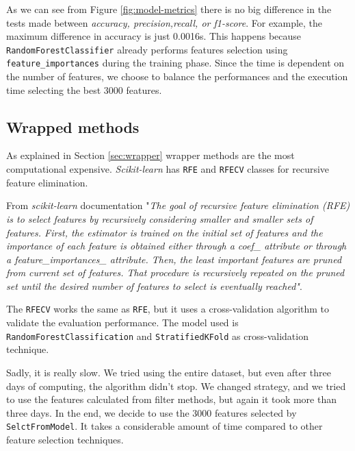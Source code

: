 As we can see from Figure \ref{fig:model-metrics} there is no big difference in the tests made between \textit{accuracy, precision,recall, or f1-score}. For example, the maximum difference in accuracy is just 0.0016s. This happens because \texttt{RandomForestClassifier} already performs features selection using \texttt{feature\_importances} during the training phase. Since the time is dependent on the number of features, we choose to balance the performances and the execution time selecting the best 3000 features.

\subsection{Wrapped methods}

As explained in Section \ref{sec:wrapper} wrapper methods are the most computational expensive. \textit{Scikit-learn} has \texttt{RFE} and \texttt{RFECV} classes for recursive feature elimination. 

From \textit{scikit-learn} documentation \cite{rfe} "\textit{The goal of recursive feature elimination (RFE) is to select features by recursively considering smaller and smaller sets of features. First, the estimator is trained on the initial set of features and the importance of each feature is obtained either through a coef\_ attribute or through a feature\_importances\_ attribute. Then, the least important features are pruned from current set of features. That procedure is recursively repeated on the pruned set until the desired number of features to select is eventually reached"}.

The \texttt{RFECV} works the same as \texttt{RFE}, but it uses a cross-validation algorithm to validate the evaluation performance.
The model used is \texttt{RandomForestClassification} and \texttt{StratifiedKFold} as cross-validation technique.

Sadly, it is really slow. We tried using the entire dataset, but even after three days of computing, the algorithm didn't stop. We changed strategy, and we tried to use the features calculated from filter methods, but again it took more than three days. In the end, we decide to use the 3000 features selected by \texttt{SelctFromModel}. It takes a considerable amount of time compared to other feature selection techniques.
